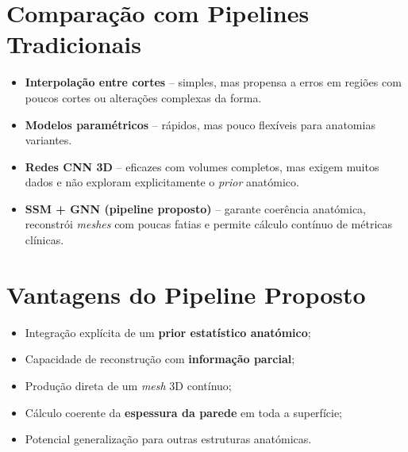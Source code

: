 \documentclass[12pt,a4paper]{report}
\begin{document}
\begin{center}
\end{center}


\section{Comparação com Pipelines Tradicionais}

\begin{itemize}
    \item \textbf{Interpolação entre cortes} – simples, mas propensa a erros em regiões com poucos cortes ou alterações complexas da forma.
    \item \textbf{Modelos paramétricos} – rápidos, mas pouco flexíveis para anatomias variantes.
    \item \textbf{Redes CNN 3D} – eficazes com volumes completos, mas exigem muitos dados e não exploram explicitamente o \textit{prior} anatómico.
    \item \textbf{SSM + GNN (pipeline proposto)} – garante coerência anatómica, reconstrói \textit{meshes} com poucas fatias e permite cálculo contínuo de métricas clínicas.
\end{itemize}

\section{Vantagens do Pipeline Proposto}

\begin{itemize}
    \item Integração explícita de um \textbf{prior estatístico anatómico};
    \item Capacidade de reconstrução com \textbf{informação parcial};
    \item Produção direta de um \textit{mesh} 3D contínuo;
    \item Cálculo coerente da \textbf{espessura da parede} em toda a superfície;
    \item Potencial generalização para outras estruturas anatómicas.
\end{itemize}
\end{document}
